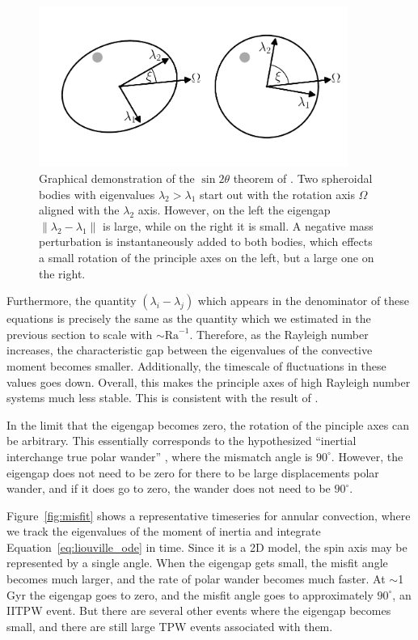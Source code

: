 \documentclass[extra,mreferee]{gji}
\begin{document}
\begin{figure}
\centering
\includegraphics[width=0.9\textwidth]{figures/perturb.pdf}
\caption{Graphical demonstration of the $\sin{2 \theta}$ theorem of \citet{davis1970rotation}.  Two spheroidal bodies with eigenvalues $\lambda_2 > \lambda_1$ start out with the rotation axis $\Omega$ aligned with the $\lambda_2$ axis. However, on the left the eigengap $\lVert \lambda_2 - \lambda_1 \rVert$ is large, while on the right it is small.  A negative mass perturbation is instantaneously added to both bodies, which effects a small rotation of the principle axes on the left, but a large one on the right.}
\label{fig:perturb}
\end{figure}

Furthermore, the quantity $(\lambda_i-\lambda_j)$ which appears in the denominator of these equations is precisely the same as the quantity which we estimated in the previous section to scale with $\sim \mathrm{Ra}^{-1}$.
Therefore, as the Rayleigh number increases, the characteristic gap between the eigenvalues of the convective moment becomes smaller.  
Additionally, the timescale of fluctuations in these values goes down. 
Overall, this makes the principle axes of high Rayleigh number systems much less stable.
This is consistent with the result of \citet{richards1999polar}.

In the limit that the eigengap becomes zero, the rotation of the pinciple axes can be arbitrary. 
This essentially corresponds to the hypothesized ``inertial interchange true polar wander'' \citep{kirschvink1997evidence}, where 
the mismatch angle is $90^\circ$. However, the eigengap does not need to be zero for there to be large displacements polar wander, 
and if it does go to zero, the wander does not need to be $90^\circ$.

Figure~\ref{fig:misfit} shows a representative timeseries for annular convection, where 
we track the eigenvalues of the moment of inertia and integrate Equation~\eqref{eq:liouville_ode} in time.
Since it is a 2D model, the spin axis may be represented by a single angle.
When the eigengap gets small, the misfit angle becomes much larger, and the rate of polar wander becomes much faster.
At $\sim$1 Gyr the eigengap goes to zero, and the misfit angle goes to approximately $90^\circ$, 
an IITPW event. But there are several other events where the eigengap becomes small, and there are 
still large TPW events associated with them.
\end{document}
